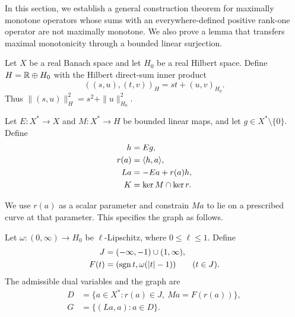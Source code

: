 In this section, we establish a general construction theorem for
maximally monotone operators whose sums with an everywhere-defined
positive rank-one operator are not maximally monotone. We also prove
a lemma that transfers maximal monotonicity through a bounded linear
surjection.





Let $X$ be a real Banach space and let $H_0$ be a real Hilbert space.
Define $H=\mathbb R\oplus H_0$ with the Hilbert direct-sum inner product
\[
((s,u),(t,v))_H=st+(u,v)_{H_0}.
\]
Thus $\|(s,u)\|_H^2=s^2+\|u\|_{H_0}^2$.

\begin{definition}
\label{def:construction-maps}
Let $E:X^*\to X$ and $M:X^*\to H$ be bounded linear maps, and let
$g\in X^*\setminus\{0\}$. Define
\[
\begin{aligned}
h&=Eg,\\
r(a)&=\langle h,a\rangle,\\
La&=-Ea+r(a)h,\\
K&=\ker M\cap\ker r.
\end{aligned}
\]
\end{definition}

We use $r(a)$ as a scalar parameter and constrain $Ma$ to lie on a
prescribed curve at that parameter. This specifies the graph as follows. 

\begin{definition}
\label{def:construction-graph}
Let $\omega:(0,\infty)\to H_0$ be $\ell$-Lipschitz, where
$0\le\ell\le1$. Define
\[
\begin{aligned}
J&=(-\infty,-1)\cup(1,\infty),\\
F(t)&=(\operatorname{sgn} t,\omega(|t|-1))\qquad(t\in J).
\end{aligned}
\]
The admissible dual variables and the graph are
\begin{equation}
\begin{aligned}
D&=\{a\in X^*:r(a)\in J,\ Ma=F(r(a))\},\\
G&=\{(La,a):a\in D\}.
\end{aligned}
\label{eq:abs-full-graph}
\end{equation}
\end{definition}

